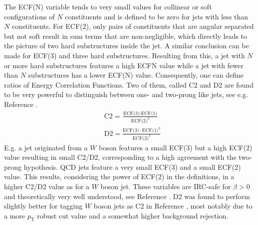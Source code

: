 The ECF(N) variable tends to very small values for collinear or soft configurations of $N$ constituents and is defined to be zero for jets with less than $N$ constituents. For ECF(2), only pairs of constituents that are angular separated but not soft result in sum terms that are non-negligible, which directly leads to the picture of two hard substructures inside the jet. A similar conclusion can be made for ECF(3) and three hard substructures. 
Resulting from this, a jet with $N$ or more hard substructures features a high ECFN value while a jet with fewer than $N$ substructures has a lower ECF(N) value. Consequently, one can define ratios of Energy Correlation Functions. Two of them, called C2 and D2 are found to be very powerful to distinguish between one- and two-prong like jets, see e.g. Reference \cite{bib:power_counting}. 
\begin{equation}
\begin{aligned}
 & \text{C2} ={} \frac{\text{ECF(3)}\cdot\text{ECF(1)}}{\text{ECF(2)}^2} \\ 
 & \text{D2} ={} \frac{\text{ECF(3)}\cdot\text{ECF(1)}^3}{\text{ECF(2)}^3}
\end{aligned}
\end{equation}\label{eq:C2D2} 
E.g. a jet originated from a $W$ boson features a small ECF(3) but a high ECF(2) value resulting in small C2/D2, corresponding to a high agreement with the two-prong hypothesis. QCD jets feature a very small ECF(3) and a small ECF(2) value. This results, considering the power of ECF(2) in the definitions, in a higher C2/D2 value as for a $W$ boson jet. 
These variables are IRC-safe for $\beta > 0$ and theoretically very well understood, see Reference \cite{bib:analytic_ECF}. D2 was found to perform slightly better for tagging $W$ boson jets as C2 in Reference \cite{bib:w_tagging}, most notably due to a more $p_{\mathrm{T}}$ robust cut value and a somewhat higher background rejection. 

